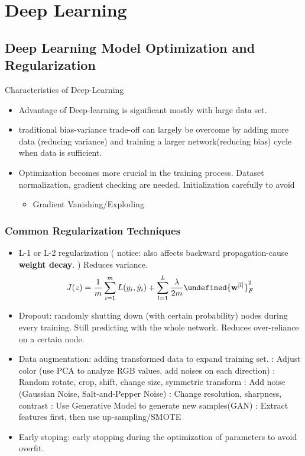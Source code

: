 \documentclass[11pt, openany]{book}              %
\let\norm\undefined %
\DeclarePairedDelimiter\norm{\lVert}{\rVert}
\begin{document}
\part{Deep Learning}

\chapter{Deep Learning Model Optimization and Regularization}

Characteristics of Deep-Learning

\begin{itemize}
    \item Advantage of Deep-learning is significant mostly with large data set.
    \item traditional bias-variance trade-off can largely be overcome by adding more data (reducing variance) and training a larger network(reducing bias) cycle when data is sufficient.
    \item Optimization becomes more crucial in the training process. Dataset normalization, gradient checking are needed. Initialization carefully to avoid 
    \begin{itemize}
    	\item Gradient Vanishing/Exploding	
    \end{itemize}
\end{itemize}

\section{Common Regularization Techniques}

\begin{itemize}
    \item L-1 or L-2 regularization ( notice: also affects backward propagation-cause 
\textbf{weight decay}. ) Reduces variance.
	$$J(z) = \frac{1}{m} \sum_{i=1}^m L(y_i,\hat{y}_i) + \sum_{l=1}^L\frac{\lambda}{2m}\norm{\mathbf{w}^{[l]}}^2_F$$
   \item Dropout: randomly shutting down (with certain probability) nodes during every training. Still predicting with the whole network. Reduces over-reliance on a certain node.
  \item Data augmentation: adding transformed data to expand training set. 
  		\subitem: Adjust color (use PCA to analyze RGB values, add noises on each direction)
  		\subitem: Random rotate, crop, shift, change size, symmetric transform
  		\subitem: Add noise (Gaussian Noise, Salt-and-Pepper Noise)
  		\subitem: Change resolution, sharpness, contrast
  		\subitem: Use Generative Model to generate new samples(GAN)
  		\subitem: Extract features first, then use up-sampling/SMOTE
 \item Early stoping: early stopping during the optimization of parameters to avoid overfit.
\end{itemize}
\end{document}
